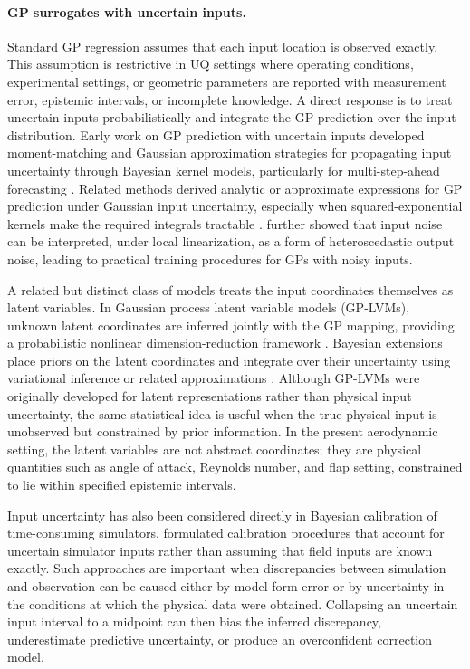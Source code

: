 \documentclass[a4paper,12pt]{article}
\begin{document}
\paragraph{GP surrogates with uncertain inputs.}
Standard GP regression assumes that each input location is observed exactly. This assumption is restrictive in UQ settings where operating conditions, experimental settings, or geometric parameters are reported with measurement error, epistemic intervals, or incomplete knowledge. A direct response is to treat uncertain inputs probabilistically and integrate the GP prediction over the input distribution. Early work on GP prediction with uncertain inputs developed moment-matching and Gaussian approximation strategies for propagating input uncertainty through Bayesian kernel models, particularly for multi-step-ahead forecasting \cite{girard2003gpuncertain,quinonero2003propagation}. Related methods derived analytic or approximate expressions for GP prediction under Gaussian input uncertainty, especially when squared-exponential kernels make the required integrals tractable \cite{dallaire2009learning}.  \citet{mchutchon2011gaussian} further showed that input noise can be interpreted, under local linearization, as a form of heteroscedastic output noise, leading to practical training procedures for GPs with noisy inputs.

A related but distinct class of models treats the input coordinates themselves as latent variables. In Gaussian process latent variable models (GP-LVMs), unknown latent coordinates are inferred jointly with the GP mapping, providing a probabilistic nonlinear dimension-reduction framework \cite{lawrence2005probabilistic}. Bayesian extensions place priors on the latent coordinates and integrate over their uncertainty using variational inference or related approximations \cite{titsias2010bayesian,damianou2016variational}. Although GP-LVMs were originally developed for latent representations rather than physical input uncertainty, the same statistical idea is useful when the true physical input is unobserved but constrained by prior information. In the present aerodynamic setting, the latent variables are not abstract coordinates; they are physical quantities such as angle of attack, Reynolds number, and flap setting, constrained to lie within specified epistemic intervals.

Input uncertainty has also been considered directly in Bayesian calibration of time-consuming simulators. \citet{perrin2019taking} formulated calibration procedures that account for uncertain simulator inputs rather than assuming that field inputs are known exactly. Such approaches are important when discrepancies between simulation and observation can be caused either by model-form error or by uncertainty in the conditions at which the physical data were obtained. Collapsing an uncertain input interval to a midpoint can then bias the inferred discrepancy, underestimate predictive uncertainty, or produce an overconfident correction model.
\end{document}
